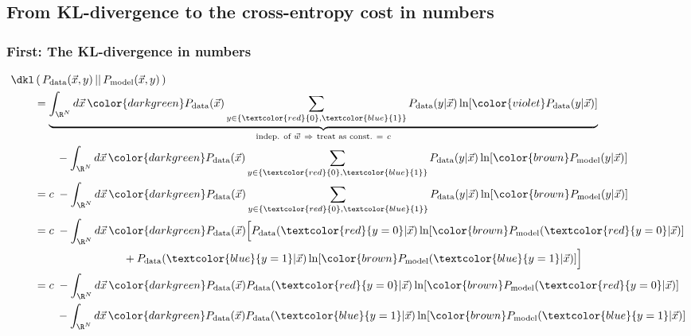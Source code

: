 \subsection{From KL-divergence to the cross-entropy cost in numbers}

\subsubsection{First: The KL-divergence in numbers}

\begin{align}
\dkl&\left(\, P_{\text{data}}(\vec x, y) \,||\, P_{\text{model}}(\vec x, y) \,\right)\\
&= \underbrace{
	\int_{\R^N} d \vec x \,
	{ \color{darkgreen} P_{\text{data}}(\vec x) }
	\sum_{y \in \{\textcolor{red}{0},\textcolor{blue}{1}\}}
	P_{\text{data}}(y | \vec x)
	\ln 
	\lbrack { \color{violet} P_{\text{data}}(y | \vec x) } \rbrack
	}_{\text{indep. of } \vec w~\Rightarrow~\text{treat as const. =}~c} \\
	&\qquad- \int_{\R^N} d \vec x \,
		{ \color{darkgreen} P_{\text{data}}(\vec x) }
			\sum_{y \in \{\textcolor{red}{0},\textcolor{blue}{1}\}}
			P_{\text{data}}(y | \vec x)
			\ln
			\lbrack {\color{brown} P_{\text{model}}(y | \vec x) } \rbrack\\
&= c \; - \int_{\R^N} d \vec x \,
		{ \color{darkgreen} P_{\text{data}}(\vec x) }
			\sum_{y \in \{\textcolor{red}{0},\textcolor{blue}{1}\}}
			P_{\text{data}}(y | \vec x)
			\ln
			\lbrack {\color{brown} P_{\text{model}}(y | \vec x) } \rbrack\\
&= c \; - \int_{\R^N} d \vec x \,
		{ \color{darkgreen} P_{\text{data}}(\vec x) }
		\Big\lbrack
			P_{\text{data}}(\textcolor{red}{y=0} | \vec x)
			\ln
			\lbrack {\color{brown} P_{\text{model}}(\textcolor{red}{y=0} | \vec x) } \rbrack\\
	&\qquad\qquad\qquad\qquad +
			P_{\text{data}}(\textcolor{blue}{y=1} | \vec x)
			\ln
			\lbrack {\color{brown} P_{\text{model}}(\textcolor{blue}{y=1} | \vec x) } \rbrack
		\Big\rbrack\\
&= c \; - \int_{\R^N} d \vec x \,
		{ \color{darkgreen} P_{\text{data}}(\vec x) }
			P_{\text{data}}(\textcolor{red}{y=0} | \vec x)
			\ln
			\lbrack {\color{brown} P_{\text{model}}(\textcolor{red}{y=0} | \vec x) } \rbrack\\
	&\qquad- \int_{\R^N} d \vec x \,
		{ \color{darkgreen} P_{\text{data}}(\vec x) }
			P_{\text{data}}(\textcolor{blue}{y=1} | \vec x)
			\ln
			\lbrack {\color{brown} P_{\text{model}}(\textcolor{blue}{y=1} | \vec x) } \rbrack
\end{align}

